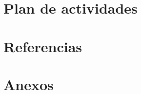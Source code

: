 \documentclass[a4paper,11pt]{article}
\begin{document}
\section{Plan de actividades}

\newpage

\section{Referencias}

\newpage

\section{Anexos}
\end{document}
